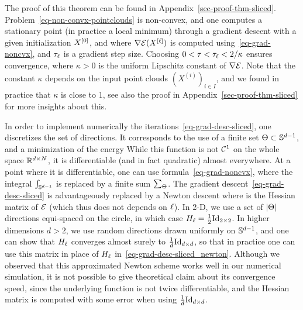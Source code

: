 The proof of this theorem can be found in Appendix~\ref{sec-proof-thm-sliced}. Problem~\eqref{eq-non-convx-pointclouds} is non-convex, and one computes a stationary point (in practice a local minimum) through a gradient descent
with a given initialization ${X}^{[0]}$, and where $\nabla \mathcal{E}(X^{[\ell]})$ is computed using~\eqref{eq-grad-noncvx}, and $\tau_\ell$ is a gradient step size. Choosing $0 < \tau < \tau_\ell < 2/\kappa$ ensures convergence, where $\kappa>0$ is the uniform Lipschitz constant of $\nabla \mathcal{E}$. Note that the constant $\kappa$ depends on the input point clouds $(X^{(i)})_{i \in I}$, and we found in practice that $\kappa$ is close to 1, see also the proof in Appendix~\ref{sec-proof-thm-sliced} for more insights about this.

In order to implement numerically the iterations~\eqref{eq-grad-desc-sliced}, one discretizes the set of directions. It corresponds to the use of a finite set $\Theta \subset \mathbb{S}^{d-1}$, and a minimization of the energy 
While this function is not $\mathcal{C}^1$ on the whole space $\mathbb{R}^{d \times N}$, it is differentiable (and in fact quadratic) almost everywhere. At a point where it is differentiable, one can use formula~\eqref{eq-grad-noncvx}, where the integral $\int_{\mathbb{S}^{d-1}}$ is replaced by a finite sum $\sum_\Theta$. The gradient descent~\eqref{eq-grad-desc-sliced} is advantageously replaced by a Newton descent
where 
is the Hessian matrix of $\mathcal{E}$ (which thus does not depends on $\ell$). In 2-D, we use a set of $|\Theta|$ directions equi-spaced on the circle, in which case $H_\ell = \frac{1}{2} \mathrm{Id}_{2 \times 2}$. In higher dimensions $d>2$, we use random directions drawn uniformly on $\mathbb{S}^{d-1}$, and one can show that $H_\ell$ converges almost surely to $\frac{1}{d} \mathrm{Id}_{d \times d}$, so that in practice one can use this matrix in place of $H_\ell$ in~\eqref{eq-grad-desc-sliced_newton}. Although we observed that this approximated Newton scheme works well in our numerical simulation, it is not possible to give theoretical claim about its convergence speed, since the underlying function is not twice differentiable, and the Hessian matrix is computed with some error when using $\frac{1}{d} \mathrm{Id}_{d \times d}$.


